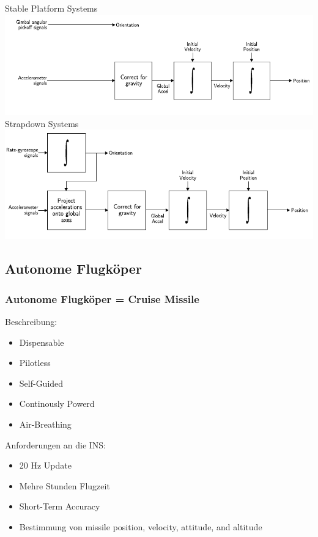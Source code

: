 \documentclass[10pt,a4paper,oneside]{beamer}
\begin{document}
\begin{frame}
	Stable Platform Systems
	\resizebox{\textwidth}{0.4\textheight} {
	\includegraphics[scale=1]{images/stable_platform.png} 
	}
	\bigskip
	Strapdown Systems
	\resizebox{\textwidth}{0.4\textheight} {
		\includegraphics[scale=1]{images/strapdown.png} 
	}

\end{frame}

\begin{frame}
	\section{Autonome Flugköper}
	\frametitle{Autonome Flugköper = Cruise Missile}
	Beschreibung: \cite{GS04}
	
	\begin{itemize}
		\item Dispensable
		\item Pilotless
		\item Self-Guided
		\item Continously Powerd
		\item Air-Breathing
	\end{itemize}
	
	Anforderungen an die INS:\\
	\begin{itemize}
		\item 20 Hz Update
		\item Mehre Stunden Flugzeit
		\item Short-Term Accuracy
		\item Bestimmung von missile position, velocity, attitude, and altitude
	\end{itemize}
	
\end{frame}
\end{document}
